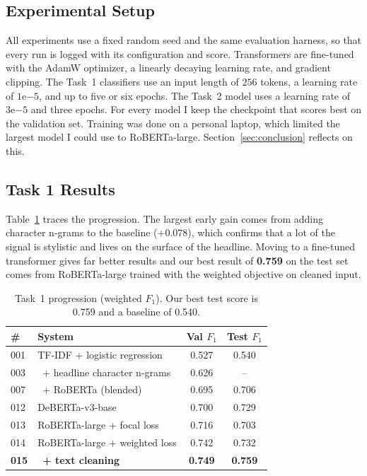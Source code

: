 \documentclass[11pt]{article}
\begin{document}
\subsection{Experimental Setup}
All experiments use a fixed random seed and the same evaluation harness, so that
every run is logged with its configuration and score. Transformers are fine-tuned
with the AdamW optimizer, a linearly decaying learning rate, and gradient
clipping. The Task~1 classifiers use an input length of $256$ tokens, a learning
rate of $1\mathrm{e}{-5}$, and up to five or six epochs. The Task~2 model uses a
learning rate of $3\mathrm{e}{-5}$ and three epochs. For every model I keep the
checkpoint that scores best on the validation set. Training was done on a personal
laptop, which limited the largest model I could use to RoBERTa-large.
Section~\ref{sec:conclusion} reflects on this.

\subsection{Task 1 Results}
Table~\ref{tab:task1} traces the progression. The largest early gain comes from
adding character n-grams to the baseline ($+0.078$), which confirms that a lot of
the signal is stylistic and lives on the surface of the headline. Moving to a
fine-tuned transformer gives far better results and our best result of
\textbf{0.759} on the test set comes from RoBERTa-large trained with
the weighted objective on cleaned input.

\begin{table}[t]
\centering\small
\begin{tabular}{@{}llcc@{}}
\toprule
\# & System & Val $F_1$ & Test $F_1$ \\
\midrule
001 & TF-IDF + logistic regression & 0.527 & 0.540 \\
003 & \ + headline character n-grams & 0.626 & -- \\
007 & \ + RoBERTa (blended) & 0.695 & 0.706 \\
012 & DeBERTa-v3-base & 0.700 & 0.729 \\
013 & RoBERTa-large + focal loss & 0.716 & 0.703 \\
014 & RoBERTa-large + weighted loss & 0.742 & 0.732 \\
\textbf{015} & \ \textbf{+ text cleaning} & \textbf{0.749} & \textbf{0.759} \\
\bottomrule
\end{tabular}
\caption{Task~1 progression (weighted $F_1$). Our best test score is 0.759 and a baseline of 0.540.}
\label{tab:task1}
\end{table}
\end{document}
